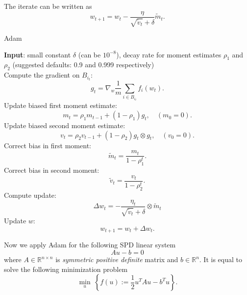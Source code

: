 The iterate can be written as 
\begin{equation}\label{Adam}
w_{t+1}=w_t-\frac{\eta}{\sqrt{\tilde{v}_t}+\delta} \tilde{m}_t.
\end{equation}


\begin{algorithm}[H]
\caption{Adam}
\label{alg:Adam}
{\bf Input}: small constant $\delta$ (can be $10^{-8}$), decay rate for moment estimates $\rho_1$ and $\rho_2$ (suggested defaults: 0.9 and 0.999 respectively)\\
Compute the gradient on $B_{i_t}$:
\begin{equation}
g_t = \nabla_{w} \frac{1}{m} \sum_{i \in B_{i_t}} f_i(w_{t}).
\end{equation}
Update biased first moment estimate:
\begin{equation}
m_t = \rho_1 m_{t-1} + (1-\rho_1)g_t, \quad (m_0 = 0).
\end{equation}
Update biased second moment estimate:
\begin{equation}
v_t = \rho_2 v_{t-1} + (1-\rho_2)g_t \otimes g_t, \quad (v_0 = 0).
\end{equation}
Correct bias in first moment:
\begin{equation}
\tilde m_t = \frac{m_t}{1 - \rho_1^{t}}.
\end{equation}
Correct bias in second moment:
\begin{equation}
\tilde v_t = \frac{v_t}{1 - \rho_2^{t}}.
\end{equation}
Compute update:
\begin{equation}
\Delta w_t =  -\frac{\eta_t}{\sqrt{\tilde v_t} + \delta} \otimes \tilde m_t
\end{equation}
Update $w$:
\begin{equation}
w_{t+1} = w_t + \Delta w_t.
\end{equation}
\end{algorithm}

Now we apply Adam for the following SPD linear system
\begin{equation}
	A u-b=0
\end{equation}
where $A \in \mathbb{R}^{n \times n}$ is \emph{symmetric positive definite} matrix and $b \in \mathbb{R}^n$.
It is equal to solve the following minimization problem
\begin{equation}
	\min_u\ \left\{f(u):= \frac{1}{2} u^T Au - b^T u\right\}.
\end{equation}

